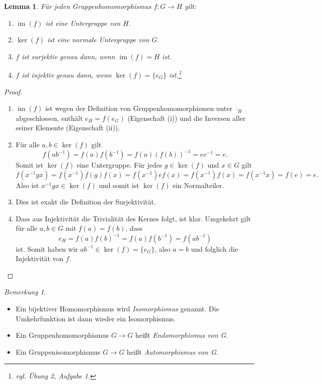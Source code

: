 \documentclass[12pt]{scrartcl} %
\DeclareMathOperator{\im}{im}
\newtheorem{lemma}[thm]{Lemma}
\theoremstyle{definition}
\theoremstyle{remark}
\newtheorem*{nb}{Bemerkung}
\begin{document}
\begin{lemma}
	Für jeden Gruppenhomomorphismus $ f: G \rightarrow H$ gilt:
	\begin{enumerate}[label=(\roman*)]
	\item $\im(f)$ ist eine Untergruppe von $H$.
	\item $\ker(f)$ ist eine normale Untergruppe von $G$.
	\item $f$ ist surjektiv genau dann, wenn $\im(f) = H$ ist.
	\item $f$ ist injektiv genau dann, wenn $\ker(f) = \{e_G\}$ ist.\footnote{vgl. Übung 2, Aufgabe 1.}
	\end{enumerate}
\end{lemma}

\begin{proof}
	\begin{enumerate}[label=(\roman*)]
	\item $\im(f)$ ist wegen der Definition von Gruppenhomomorphismen unter $\cdot_H$ abgeschlossen, enthält $e_H = f(e_G)$ (Eigenschaft (i)) und die Inversen aller seiner Elemente (Eigenschaft (ii)).
	\item Für alle $a, b \in \ker(f)$ gilt
		$$ f(ab^{-1}) = f(a)f(b^{-1}) = f(a)(f(b))^{-1} = ee^{-1} = e.$$
		Somit ist $\ker(f)$ eine Untergruppe.
		Für jedes $ g \in \ker(f)$ und $x \in G$ gilt
		$$ f(x^{-1}gx) = f(x^{-1})f(g)f(x) = f(x^{-1}) e f(x) = f(x^{-1})f(x) = f(x^{-1}x) = f(e) = e.$$
		Also ist $x^{-1}gx \in \ker(f) $ und somit ist $\ker(f)$ ein Normalteiler.
	\item Dies ist exakt die Definition der Surjektivität.
	\item Dass aus Injektivität die Trivialität des Kernes folgt, ist klar.
		Umgekehrt gilt für alle \(a, b \in G\) mit \(f(a) = f(b)\), dass \[e_H = f(a)f(b)^{-1} =f(a)f(b^{-1}) = f(ab^{-1})\] ist.
		Somit haben wir \(ab^{-1} \in \ker(f) = \{e_G\}\), also \(a = b\) und folglich die Injektivität von \(f\). \qedhere
	\end{enumerate}	
\end{proof}

\begin{nb}
	\begin{itemize}
	\item Ein bijektiver Homomorphismus wird \emph{Isomorphismus} genannt. Die Umkehrfunktion ist dann wieder ein Isomorphismus.
	\item Ein Gruppenhomomorphismus $G \rightarrow G$ heißt \emph{Endomorphismus von G}.
	\item Ein Gruppenisomorphismus $G \rightarrow G$ heißt \emph{Automorphismus von G}.
	\end{itemize}
\end{nb}
\end{document}
